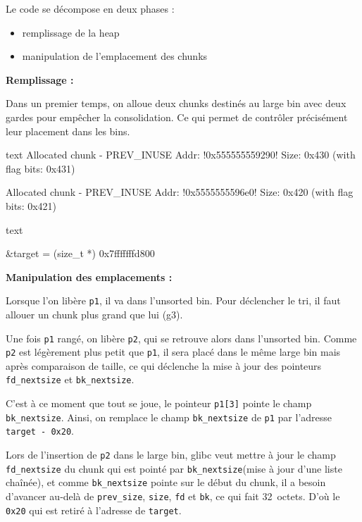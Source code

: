 Le code se décompose en deux phases :
\begin{itemize}
    \item remplissage de la heap
    \item manipulation de l'emplacement des chunks
\end{itemize}

\textbf{Remplissage :}

Dans un premier temps, on alloue deux chunks destinés au large bin avec deux gardes
pour empêcher la consolidation.
Ce qui permet de contrôler précisément leur placement dans les bins.

\begin{pwndbg}[heap]{text}
    Allocated chunk - PREV_INUSE
    Addr: !\textcolor{pwndbgred}{0x555555559290}!
    Size: 0x430 (with flag bits: 0x431)

    Allocated chunk - PREV_INUSE
    Addr: !\textcolor{pwndbgblue}{0x5555555596e0}!
    Size: 0x420 (with flag bits: 0x421)
\end{pwndbg}

\begin{pwndbg}[p \&target]{text}

    &target = (size_t *) 0x7fffffffd800

\end{pwndbg}

\textbf{Manipulation des emplacements :}

Lorsque l'on libère \texttt{p1}, il va dans l'unsorted bin. Pour déclencher le tri,
il faut allouer un chunk plus grand que lui (g3).

Une fois \texttt{p1} rangé, on libère \texttt{p2}, qui se retrouve alors dans l'unsorted bin.
Comme \texttt{p2} est légèrement plus petit que \texttt{p1}, il sera placé dans le même large bin
mais après comparaison de taille, ce qui déclenche la mise à jour des pointeurs
\texttt{fd\_nextsize} et \texttt{bk\_nextsize}.

C'est à ce moment que tout se joue, le pointeur \texttt{p1[3]} pointe le champ \texttt{bk\_nextsize}.
Ainsi, on remplace le champ \texttt{bk\_nextsize} de \texttt{p1}
par l’adresse \texttt{target - 0x20}.

Lors de l'insertion de \texttt{p2} dans le large bin, glibc veut mettre à jour
le champ \texttt{fd\_nextsize} du chunk qui est pointé par \texttt{bk\_nextsize}(mise à jour d’une liste chaînée),
et comme \texttt{bk\_nextsize} pointe sur le début du chunk, il a besoin d'avancer
au‑delà de \texttt{prev\_size}, \texttt{size}, \texttt{fd} et \texttt{bk},
ce qui fait 32~octets.
D'où le \texttt{0x20} qui est retiré à l'adresse de \texttt{target}.

